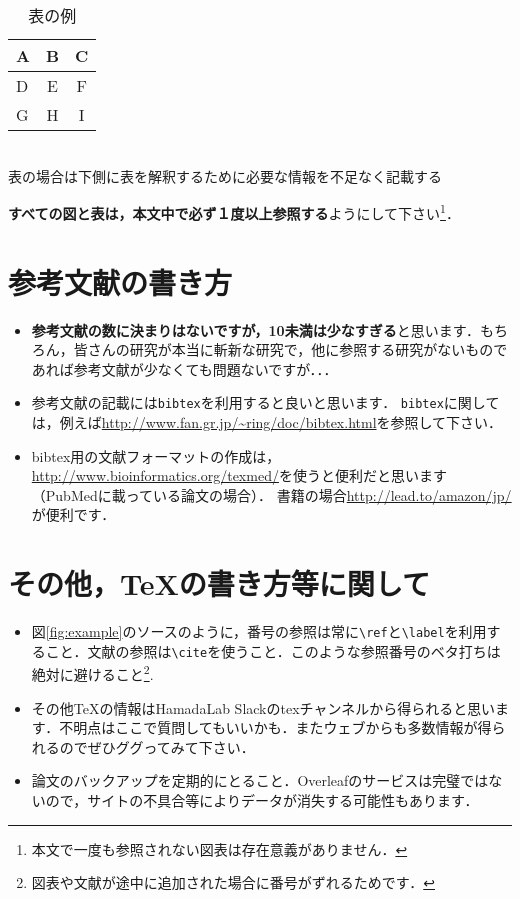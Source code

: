 \documentclass[dvipdfmx,autodetect-engine]{jsreport}
\begin{document}
\begin{table}[h]
\caption{\label{tab:example} 表の例}
\begin{center}
\begin{tabular}{lcc}
\toprule
A & B & C \\
\midrule
D & E & F \\
G & H & I \\
\bottomrule
\end{tabular}\\
{\footnotesize 
表の場合は下側に表を解釈するために必要な情報を不足なく記載する}
\end{center}
\end{table}

\textbf{すべての図と表は，本文中で必ず１度以上参照する}ようにして下さい\footnote{本文で一度も参照されない図表は存在意義がありません．}．

\section{参考文献の書き方}

\begin{itemize}
\item \textbf{参考文献の数に決まりはないですが，10未満は少なすぎる}と思います．もちろん，皆さんの研究が本当に斬新な研究で，他に参照する研究がないものであれば参考文献が少なくても問題ないですが．．．
\item 参考文献の記載には\texttt{bibtex}を利用すると良いと思います．
\texttt{bibtex}に関しては，例えば\url{http://www.fan.gr.jp/~ring/doc/bibtex.html}を参照して下さい．
%
\item bibtex用の文献フォーマットの作成は，\url{http://www.bioinformatics.org/texmed/}を使うと便利だと思います（PubMedに載っている論文の場合）．
書籍の場合\url{http://lead.to/amazon/jp/}が便利です．
\end{itemize}



\section{その他，\TeX の書き方等に関して}

\begin{itemize}
\item 図\ref{fig:example}のソースのように，番号の参照は常に\texttt{\textbackslash ref}と\texttt{\textbackslash label}を利用すること．文献の参照は\texttt{\textbackslash cite}を使うこと．このような参照番号のベタ打ちは絶対に避けること\footnote{図表や文献が途中に追加された場合に番号がずれるためです．}.
\item その他\TeX の情報はHamadaLab Slackのtexチャンネルから得られると思います．不明点はここで質問してもいいかも．またウェブからも多数情報が得られるのでぜひググってみて下さい．
\item 論文のバックアップを定期的にとること．Overleafのサービスは完璧ではないので，サイトの不具合等によりデータが消失する可能性もあります．
\end{itemize}
\end{document}
